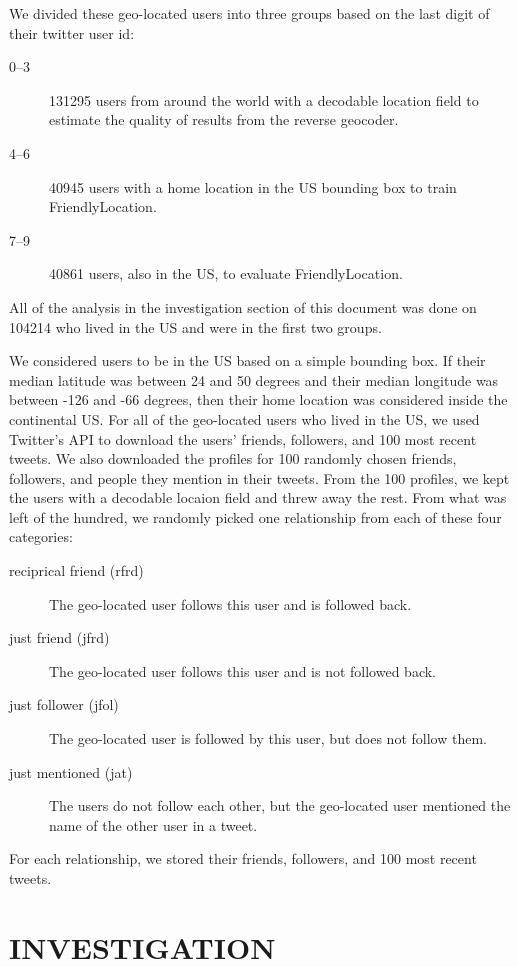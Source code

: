 \documentclass{sig-alternate}
\begin{document}
We divided these geo-located users into three groups based on the last digit of their twitter user id:
\begin{description}
\item[0--3] 131295 users from around the world with a decodable location field to estimate the quality of results from the reverse geocoder.
\item[4--6] 40945 users with a home location in the US bounding box to train FriendlyLocation.
\item[7--9] 40861 users, also in the US, to evaluate FriendlyLocation.
\end{description}

All of the analysis in the investigation section of this document was done on 104214 who lived in the US and were in the first two groups.

We considered users to be in the US based on a simple bounding box.  If their median latitude was between 24 and 50 degrees and their median longitude was between -126 and -66 degrees, then their home location was considered inside the continental US.
For all of the geo-located users who lived in the US, we used Twitter's API to download the users' friends, followers, and 100 most recent tweets. We also downloaded the profiles for 100 randomly chosen friends, followers, and people they mention in their tweets.
From the 100 profiles, we kept the users with a decodable locaion field and threw away the rest. From what was left of the hundred, we randomly picked one relationship from each of these four categories:
\begin{description}
\item[reciprical friend (rfrd)] The geo-located user follows this user and is followed back.
\item[just friend (jfrd)] The geo-located user follows this user and is not followed back.
\item[just follower (jfol)]The geo-located user is followed by this user, but does not follow them.
\item[just mentioned (jat)] The users do not follow each other, but the geo-located user mentioned the name of the other user in a tweet.
\end{description}
For each relationship, we stored their friends, followers, and 100 most recent tweets.

\section{INVESTIGATION}
\end{document}
